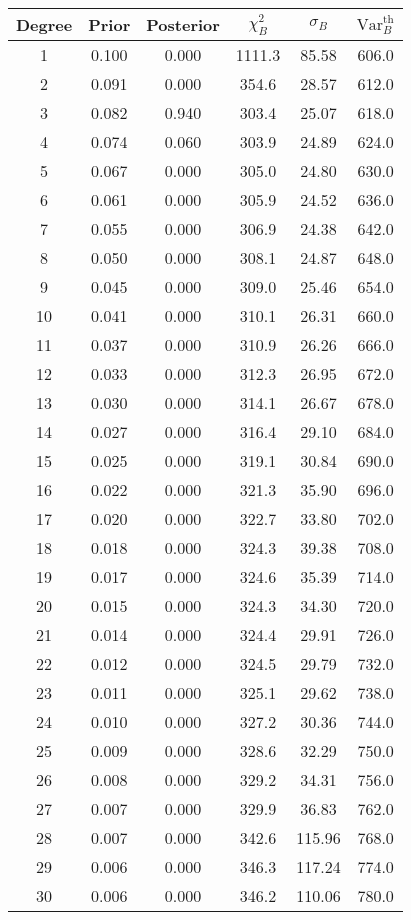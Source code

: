 \begin{tabular}{c c c c c c}
\toprule
Degree & Prior & Posterior & $\chi^2_B$ & $\sigma_B$ & $\mathrm{Var}_B^{\text{th}}$ \\
\midrule
1 & 0.100 & 0.000 & 1111.3 & 85.58 & 606.0 \\
2 & 0.091 & 0.000 & 354.6 & 28.57 & 612.0 \\
3 & 0.082 & 0.940 & 303.4 & 25.07 & 618.0 \\
4 & 0.074 & 0.060 & 303.9 & 24.89 & 624.0 \\
5 & 0.067 & 0.000 & 305.0 & 24.80 & 630.0 \\
6 & 0.061 & 0.000 & 305.9 & 24.52 & 636.0 \\
7 & 0.055 & 0.000 & 306.9 & 24.38 & 642.0 \\
8 & 0.050 & 0.000 & 308.1 & 24.87 & 648.0 \\
9 & 0.045 & 0.000 & 309.0 & 25.46 & 654.0 \\
10 & 0.041 & 0.000 & 310.1 & 26.31 & 660.0 \\
11 & 0.037 & 0.000 & 310.9 & 26.26 & 666.0 \\
12 & 0.033 & 0.000 & 312.3 & 26.95 & 672.0 \\
13 & 0.030 & 0.000 & 314.1 & 26.67 & 678.0 \\
14 & 0.027 & 0.000 & 316.4 & 29.10 & 684.0 \\
15 & 0.025 & 0.000 & 319.1 & 30.84 & 690.0 \\
16 & 0.022 & 0.000 & 321.3 & 35.90 & 696.0 \\
17 & 0.020 & 0.000 & 322.7 & 33.80 & 702.0 \\
18 & 0.018 & 0.000 & 324.3 & 39.38 & 708.0 \\
19 & 0.017 & 0.000 & 324.6 & 35.39 & 714.0 \\
20 & 0.015 & 0.000 & 324.3 & 34.30 & 720.0 \\
21 & 0.014 & 0.000 & 324.4 & 29.91 & 726.0 \\
22 & 0.012 & 0.000 & 324.5 & 29.79 & 732.0 \\
23 & 0.011 & 0.000 & 325.1 & 29.62 & 738.0 \\
24 & 0.010 & 0.000 & 327.2 & 30.36 & 744.0 \\
25 & 0.009 & 0.000 & 328.6 & 32.29 & 750.0 \\
26 & 0.008 & 0.000 & 329.2 & 34.31 & 756.0 \\
27 & 0.007 & 0.000 & 329.9 & 36.83 & 762.0 \\
28 & 0.007 & 0.000 & 342.6 & 115.96 & 768.0 \\
29 & 0.006 & 0.000 & 346.3 & 117.24 & 774.0 \\
30 & 0.006 & 0.000 & 346.2 & 110.06 & 780.0 \\
\bottomrule
\end{tabular}
